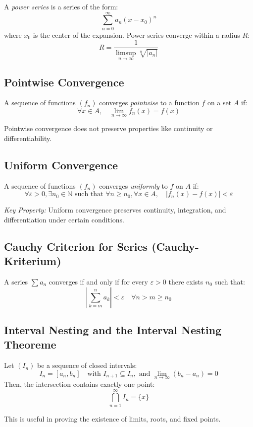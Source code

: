 A \emph{power series} is a series of the form:
\[
\sum_{n=0}^{\infty} a_n (x - x_0)^n
\]
where \(x_0\) is the center of the expansion. Power series converge within a radius \(R\):
\[
R = \frac{1}{\limsup\limits_{n \to \infty} \sqrt[n]{|a_n|}}
\]

\subsection{Pointwise Convergence}

A sequence of functions \((f_n)\) converges \emph{pointwise} to a function \(f\) on a set \(A\) if:
\[
\forall x \in A, \quad \lim_{n \to \infty} f_n(x) = f(x)
\]

Pointwise convergence does not preserve properties like continuity or differentiability.

\subsection{Uniform Convergence}

A sequence of functions \((f_n)\) converges \emph{uniformly} to \(f\) on \(A\) if:
\[
\forall \varepsilon > 0, \exists n_0 \in \mathbb{N} \text{ such that } \forall n \ge n_0, \forall x \in A, \quad |f_n(x) - f(x)| < \varepsilon
\]

\emph{Key Property:} Uniform convergence preserves continuity, integration, and differentiation under certain conditions.

\subsection{Cauchy Criterion for Series (Cauchy-Kriterium)}

A series \(\sum a_n\) converges if and only if for every \(\varepsilon > 0\) there exists \(n_0\) such that:
\[
\left| \sum_{k = m}^{n} a_k \right| < \varepsilon \quad \forall n > m \ge n_0
\]

\subsection{Interval Nesting and the Interval Nesting Theoreme}

Let \((I_n)\) be a sequence of closed intervals:
\[
I_n = [a_n, b_n] \quad \text{with } I_{n+1} \subseteq I_n, \text{ and } \lim_{n \to \infty} (b_n - a_n) = 0
\]
Then, the intersection contains exactly one point:
\[
\bigcap_{n=1}^{\infty} I_n = \{x\}
\]

This is useful in proving the existence of limits, roots, and fixed points.

